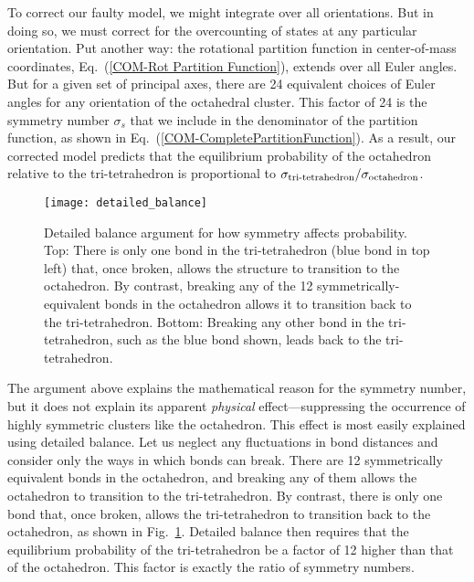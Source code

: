 \documentclass[pre, aps, twocolumn, reprint, amsmath,amssymb, showpacs,
superscriptaddress] {revtex4-1}
\begin{document}
To correct our faulty model, we might integrate over all orientations.
But in doing so, we must correct for the overcounting of states at any
particular orientation. Put another way: the rotational partition
function in center-of-mass coordinates, Eq.~(\ref{COM-Rot Partition
  Function}), extends over all Euler angles. But for a given set of
principal axes, there are 24 equivalent choices of Euler angles for any
orientation of the octahedral cluster. This factor of 24 is the symmetry
number $\sigma_s$ that we include in the denominator of the partition
function, as shown in Eq.~(\ref{COM-CompletePartitionFunction}). As a
result, our corrected model predicts that the equilibrium probability of
the octahedron relative to the tri-tetrahedron is proportional to
$\sigma_\textnormal{tri-tetrahedron}/\sigma_\textnormal{octahedron}$.

\begin{figure}
	\begin{centering}
    \texttt{[image: detailed\_balance]}
    \caption{Detailed balance argument for how symmetry affects
      probability.  Top: There is only one bond in the tri-tetrahedron (blue
      bond in top left) that, once broken, allows the structure to
      transition to the octahedron. By contrast, breaking any of the 12
      symmetrically-equivalent bonds in the octahedron allows it to
      transition back to the tri-tetrahedron. Bottom: Breaking any other
      bond in the tri-tetrahedron, such as the blue bond shown, leads
      back to the tri-tetrahedron.
      \label{fig:Detailed_Balance}}
	\end{centering}
\end{figure}

The argument above explains the mathematical reason for the symmetry
number, but it does not explain its apparent \emph{physical}
effect---suppressing the occurrence of highly symmetric clusters like
the octahedron. This effect is most easily explained using detailed
balance. Let us neglect any fluctuations in bond distances and consider
only the ways in which bonds can break. There are 12 symmetrically
equivalent bonds in the octahedron, and breaking any of them allows the
octahedron to transition to the tri-tetrahedron. By contrast, there is
only one bond that, once broken, allows the tri-tetrahedron to
transition back to the octahedron, as shown in
Fig.~\ref{fig:Detailed_Balance}. Detailed balance then requires that the
equilibrium probability of the tri-tetrahedron be a factor of 12 higher
than that of the octahedron. This factor is exactly the ratio of
symmetry numbers.
\end{document}
